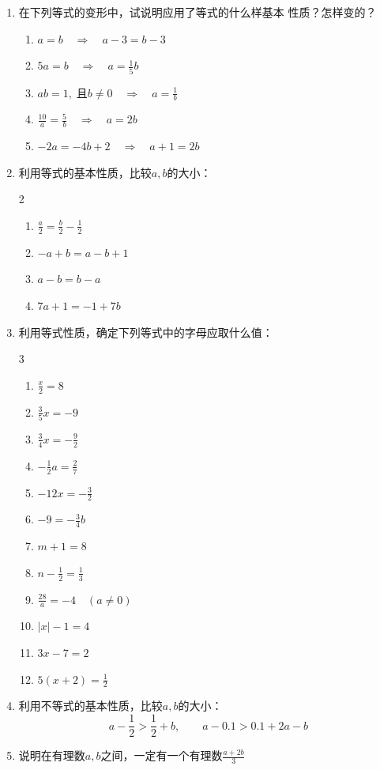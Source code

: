 \begin{enumerate}
\item  在下列等式的变形中，试说明应用了等式的什么样基本
性质？怎样变的？
\begin{enumerate}
    \item $a=b\quad \Rightarrow\quad a-3=b-3$
    \item $ 5a=b  \quad \Rightarrow\quad  a=\frac{1}{5}b $
    \item  $ ab=1,\; \text{且}b\ne 0  \quad \Rightarrow\quad  a=\frac{1}{b} $
    \item  $ \frac{10}{a}=\frac{5}{b}  \quad \Rightarrow\quad a=2b  $
    \item $ -2a=-4b+2  \quad \Rightarrow\quad  a+1=2b $
\end{enumerate}

\item 利用等式的基本性质，比较$a,b$的大小：
\begin{multicols}{2}
\begin{enumerate}
    \item $\frac{a}{2}=\frac{b}{2}-\frac{1}{2}$
    \item $-a+b=a-b+1$
    \item $a-b=b-a$
    \item $7a+1=-1+7b$
\end{enumerate}
\end{multicols}

\item 利用等式性质，确定下列等式中的字母应取什么值：
\begin{multicols}{3}
    \begin{enumerate}
        \item $\frac{x}{2}=8 $
        \item $\frac{3}{5}x=-9 $
        \item $\frac{3}{4}x=-\frac{9}{2} $
        \item $-\frac{1}{2}a=\frac{2}{7} $
        \item $-12x=-\frac{3}{2} $
        \item $-9=-\frac{3}{4}b $
        \item $m+1=8 $
        \item $n-\frac{1}{2}=\frac{1}{3} $
        \item $\frac{28}{a}=-4\quad (a\ne 0) $
        \item $|x|-1=4 $
        \item $3x-7=2 $
        \item $5(x+2)=\frac{1}{2} $
    \end{enumerate}
    \end{multicols}

\item 利用不等式的基本性质，比较$a, b$的大小：
\[a-\frac{1}{2}>\frac{1}{2}+b,\qquad a-0.1>0.1+2a-b \]

\item 说明在有理数$a, b$之间，一定有一个有理数$\frac{a+2b}{3}$
\end{enumerate}

